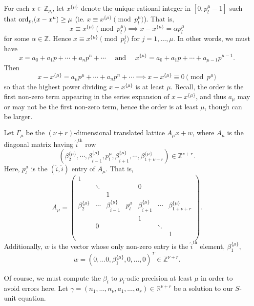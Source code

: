 For each $x \in \mathbb{Z}_{p_l}$, let $x^{\{\mu\}}$ denote the unique rational integer in $[0,p_l^{\mu} - 1]$ such that $\operatorname{ord}_{p_l}(x - x^{\mu}) \geq \mu$ (ie. $x \equiv x^{\{\mu\}} \pmod{p_l^{\mu}}$). That is, 
\[x \equiv x^{\{\mu\}} \pmod{p_l^{\mu}} \implies x - x^{\{\mu\}} =\alpha p_l^{\mu}\]
for some $\alpha \in \mathbb{Z}$. Hence $x \equiv x^{\{\mu\}} \pmod{p_l^{j}}$ for $j =1, \dots, \mu$. In other words, we must have
\[x = a_0+ a_1 p + \cdots + a_n p^n + \cdots \quad \text{ and } \quad x^{\{\mu\}} = a_0+ a_1 p + \cdots + a_{\mu - 1}p^{\mu - 1}.\]
Then 
\[x - x^{\{\mu\}} = a_{\mu}p^{\mu} + \cdots + a_n p^n + \cdots \implies x - x^{\{\mu\}} \equiv 0 \pmod{p^{\mu}}\]
so that the highest power dividing $x - x^{\{\mu\}}$ is at least $\mu$. Recall, the order is the first non-zero term appearing in the series expansion of $x - x^{\{\mu\}}$, and thus $a_{\mu}$ may or may not be the first non-zero term, hence the order is at least $\mu$, though can be larger.

Let $\Gamma_{\mu}$ be the $(\nu+r)$-dimensional translated lattice $A_{\mu}x + w$, where $A_{\mu}$ is the diagonal matrix having $\hat{i}^{\text{th}}$ row 
\[\left(\beta_2^{\{\mu\}}, \cdots, \beta_{\hat{i} - 1}^{\{\mu\}}, p_l^{\mu}, \beta_{\hat{i} + 1}^{\{\mu\}}, \cdots, \beta_{1+ \nu+ r}^{\{\mu\}}\right) \in \mathbb{Z}^{\nu+r}.\]
Here, $p_l^{\mu}$ is the $(\hat{i},\hat{i})$ entry of $A_{\mu}$. That is, 
\[A_{\mu} = 
\begin{pmatrix}
1	& 		&		&		&		&		&	\\
	& \ddots	& 		&		& 0		& 		&	\\
	&		& 1		&		&		&		&	\\
	\beta_2^{\{\mu\}}& \cdots & \beta_{\hat{i} - 1}^{\{\mu\}} & p_l^{\mu} & \beta_{\hat{i} + 1}^{\{\mu\}}& \cdots &\beta_{1+ \nu+ r}^{\{\mu\}}\\
	& 		& 		& 		& 1		&		&	\\	
	& 0		& 		& 		&		& \ddots	&	\\	
	& 		& 		& 		&		& 		& 1	\\	
\end{pmatrix}.\]
Additionally, $w$ is the vector whose only non-zero entry is the $\hat{i}^{\text{th}}$ element, $ \beta_1^{\{\mu\}}$,
\[w = (0, \dots 0, \beta_1^{\{\mu\}},0, \dots, 0)^T \in \mathbb{Z}^{\nu + r}.\]

Of course, we must compute the $\beta_i$ to $p_l$-adic precision at least $\mu$ in order to avoid errors here. 
Let $\gamma = (n_1, \dots, n_{\nu}, a_1, \dots, a_r) \in \mathbb{R}^{\nu + r}$ be a solution to our $S$-unit equation. 

